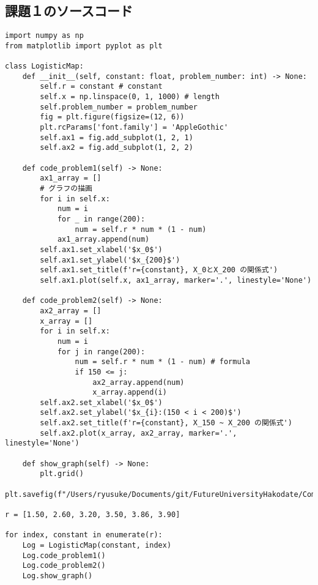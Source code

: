 \documentclass[a4j]{jsarticle}
\begin{document}
\newpage

\subsection{課題１のソースコード}

\begin{lstlisting}[caption=Pythonによるロジスティック写像の描画]
import numpy as np
from matplotlib import pyplot as plt

class LogisticMap:
    def __init__(self, constant: float, problem_number: int) -> None:
        self.r = constant # constant
        self.x = np.linspace(0, 1, 1000) # length
        self.problem_number = problem_number
        fig = plt.figure(figsize=(12, 6))
        plt.rcParams['font.family'] = 'AppleGothic'
        self.ax1 = fig.add_subplot(1, 2, 1)
        self.ax2 = fig.add_subplot(1, 2, 2)

    def code_problem1(self) -> None:
        ax1_array = []
        # グラフの描画
        for i in self.x:
            num = i
            for _ in range(200):
                num = self.r * num * (1 - num)
            ax1_array.append(num)
        self.ax1.set_xlabel('$x_0$')
        self.ax1.set_ylabel('$x_{200}$')
        self.ax1.set_title(f'r={constant}, X_0とX_200 の関係式')
        self.ax1.plot(self.x, ax1_array, marker='.', linestyle='None')

    def code_problem2(self) -> None:
        ax2_array = []
        x_array = []
        for i in self.x:
            num = i
            for j in range(200):
                num = self.r * num * (1 - num) # formula
                if 150 <= j:
                    ax2_array.append(num)
                    x_array.append(i)
        self.ax2.set_xlabel('$x_0$')
        self.ax2.set_ylabel('$x_{i}:(150 < i < 200)$')
        self.ax2.set_title(f'r={constant}, X_150 ~ X_200 の関係式')
        self.ax2.plot(x_array, ax2_array, marker='.', linestyle='None')

    def show_graph(self) -> None:
        plt.grid()
        plt.savefig(f"/Users/ryusuke/Documents/git/FutureUniversityHakodate/ComplexScienceExercise/result/week02_{self.problem_number}.png")

r = [1.50, 2.60, 3.20, 3.50, 3.86, 3.90]

for index, constant in enumerate(r):
    Log = LogisticMap(constant, index)
    Log.code_problem1()
    Log.code_problem2()
    Log.show_graph()
\end{lstlisting}

\newpage
\end{document}
